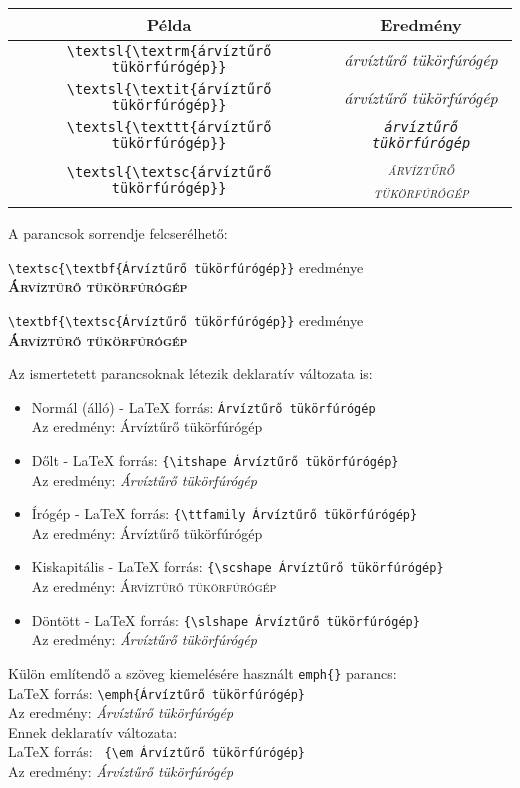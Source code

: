 \documentclass{article}
\begin{document}
\begin{tabular}{|c|c|}
	\hline	
	\textbf{Példa}  & \textbf{Eredmény} \\
	\hline
	\verb!\textsl{\textrm{árvíztűrő tükörfúrógép}}! & \textsl{\textrm{árvíztűrő tükörfúrógép}} \\
	\verb!\textsl{\textit{árvíztűrő tükörfúrógép}}! & \textsl{\textit{árvíztűrő  tükörfúrógép}} \\
	\verb!\textsl{\texttt{árvíztűrő tükörfúrógép}}! & \textsl{\texttt{árvíztűrő tükörfúrógép}}  \\
	\verb!\textsl{\textsc{árvíztűrő tükörfúrógép}}! & \textsl{\textsc{árvíztűrő tükörfúrógép}} \\
	\hline
\end{tabular}

\vspace*{0.2in} 
A parancsok sorrendje felcserélhető:

\verb!\textsc{\textbf{Árvíztűrő tükörfúrógép}}! eredménye \\\textsc{\textbf{Árvíztűrő tükörfúrógép}}

\verb!\textbf{\textsc{Árvíztűrő tükörfúrógép}}! eredménye \\\textbf{\textsc{Árvíztűrő tükörfúrógép}}

Az ismertetett parancsoknak létezik deklaratív változata is:

\begin{itemize}
\item Normál (álló) -  \LaTeX{} forrás: \verb!Árvíztűrő tükörfúrógép!\\
Az eredmény: Árvíztűrő tükörfúrógép
\item Dőlt -  \LaTeX{} forrás: \verb!{\itshape Árvíztűrő tükörfúrógép}!\\
Az eredmény: {\itshape Árvíztűrő tükörfúrógép}
\item Írógép -  \LaTeX{} forrás: \verb!{\ttfamily Árvíztűrő tükörfúrógép}!\\
Az eredmény: {\ttfamily Árvíztűrő tükörfúrógép}
\item Kiskapitális -  \LaTeX{} forrás: \verb!{\scshape Árvíztűrő tükörfúrógép}!\\
Az eredmény: {\scshape Árvíztűrő tükörfúrógép}
\item Döntött -  \LaTeX{} forrás: \verb!{\slshape Árvíztűrő tükörfúrógép}!\\
Az eredmény: {\slshape Árvíztűrő tükörfúrógép}	
\end{itemize}

Külön említendő a szöveg kiemelésére használt \verb!emph{}! parancs:\\
\vspace*{0.1in}
\LaTeX{} forrás: \verb!\emph{Árvíztűrő tükörfúrógép}!\\
Az eredmény: \emph{Árvíztűrő tükörfúrógép}\\
Ennek deklaratív változata:\\
\vspace*{0.1in}
\LaTeX{} forrás: \verb! {\em Árvíztűrő tükörfúrógép}!\\
Az eredmény: {\em Árvíztűrő tükörfúrógép}
\end{document}

